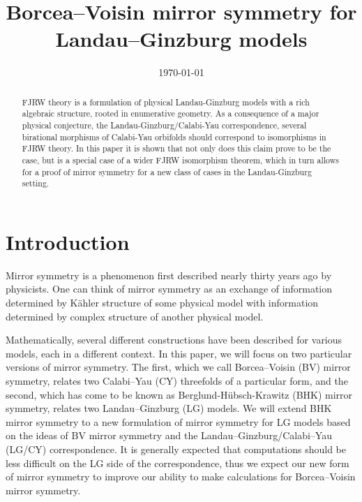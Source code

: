 \documentclass[10pt, letterpaper]{amsart}
\theoremstyle{remark}
\newcommand{\amandain}[1]{\todo[bordercolor=red(munsell),backgroundcolor=eggshell, author=Am, inline]{#1}}
\begin{document}
\date{\today}

\title{Borcea--Voisin mirror symmetry for Landau--Ginzburg models}

\begin{abstract}
FJRW theory is a formulation of physical Landau-Ginzburg models with a rich algebraic structure, rooted in enumerative geometry. As a consequence of a major physical conjecture, the Landau-Ginzburg/Calabi-Yau correspondence, several birational morphisms of Calabi-Yau orbifolds should correspond to isomorphisms in FJRW theory. In this paper it is shown that not only does this claim prove to be the case, but is a special case of a wider FJRW isomorphism theorem, which in turn allows for a proof of mirror symmetry for a new class of cases in the Landau-Ginzburg setting. 
\end{abstract}


\maketitle



\section{Introduction}

Mirror symmetry is a phenomenon first described nearly thirty years ago by physicists. One can think of mirror symmetry as an exchange of information determined by K\"ahler structure of some physical model with information determined by complex structure of another physical model. 

Mathematically, several different constructions have been described for various models, each in a different context. In this paper, we will focus on two particular versions of mirror symmetry. The first, which we call Borcea--Voisin (BV) mirror symmetry, relates two Calabi--Yau (CY) threefolds of a particular form, and the second, which has come to be known as Berglund-H\"ubsch-Krawitz (BHK) mirror symmetry, relates two Landau--Ginzburg (LG) models. We will extend BHK mirror symmetry to a new formulation of mirror symmetry for LG models based on the ideas of BV mirror symmetry and the Landau--Ginzburg/Calabi--Yau (LG/CY) correspondence. It is generally expected that computations should be less difficult on the LG side of the correspondence, thus we expect our new form of mirror symmetry to improve our ability to make calculations for Borcea--Voisin mirror symmetry. 
\end{document}
